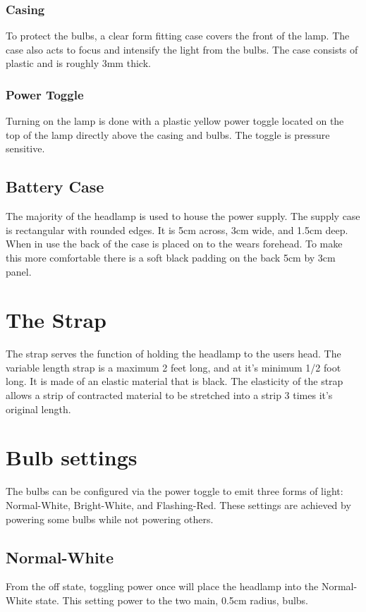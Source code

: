 \documentclass[12pt]{article}
\begin{document}
\subsubsection{Casing} To protect the bulbs, a clear form fitting case covers the front of the lamp.
The case also acts to focus and intensify the light from the bulbs. The case consists of plastic and
is roughly 3mm thick.

\subsubsection{Power Toggle} Turning on the lamp is done with a plastic yellow power toggle located
on the top of the lamp directly above the casing and bulbs. The toggle is pressure sensitive.

\subsection{Battery Case} The majority of the headlamp is used to house the power supply. The supply
case is rectangular with rounded edges. It is 5cm across, 3cm wide, and 1.5cm deep. When in use the
back of the case is placed on to the wears forehead. To make this more comfortable there is a soft
black padding on the back 5cm by 3cm panel.

\section{The Strap} The strap serves the function of holding the headlamp to the users head. The
variable length strap is a maximum 2 feet long, and at it's minimum 1/2 foot long. It is made of an
elastic material that is black. The elasticity of the strap allows a strip of contracted material to
be stretched into a strip 3 times it's original length.

\section{Bulb settings}
The bulbs can be configured via the power toggle to emit three forms of light: Normal-White,
Bright-White, and Flashing-Red. These settings are achieved by powering some bulbs while not
powering others.

\subsection{Normal-White}
From the off state, toggling power once will place the headlamp into the Normal-White state.  This
setting power to the two main, 0.5cm radius, bulbs.
\end{document}
